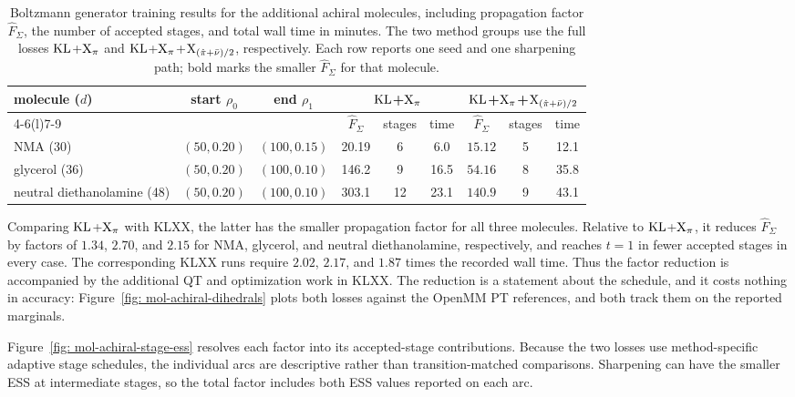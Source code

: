 \documentclass{article}
\begin{document}
\begin{table}[htb]
\centering
\small
\setlength{\tabcolsep}{3.5pt}
\begin{tabular}{lcccccccc}
\toprule
\multirow{2}{*}{molecule (\(d\))} &
\multirow{2}{*}{start \(\rho_0\)} &
\multirow{2}{*}{end \(\rho_1\)} &
\multicolumn{3}{c}{$\mathrm{KL}$+$\mathrm{X}_\pi$} &
\multicolumn{3}{c}{$\mathrm{KL}$+$\mathrm{X}_\pi$+$\mathrm{X}_{(\hat\pi+\bar\nu)/2}$} \\
\cmidrule(lr){4-6}\cmidrule(l){7-9}
& & & \(\hat F_\Sigma\) & stages & time
  & \(\hat F_\Sigma\) & stages & time \\
\midrule
NMA (30) & \((50,0.20)\) & \((100,0.15)\)
& 20.19 & 6 & 6.0 & \(\mathbf{15.12}\) & 5 & 12.1 \\
\addlinespace
glycerol (36) & \((50,0.20)\) & \((100,0.10)\)
& 146.2 & 9 & 16.5 & \(\mathbf{54.16}\) & 8 & 35.8 \\
\addlinespace
neutral diethanolamine (48) & \((50,0.20)\) & \((100,0.10)\)
& 303.1 & 12 & 23.1 & \(\mathbf{140.9}\) & 9 & 43.1 \\
\bottomrule
\end{tabular}
\caption{Boltzmann generator training results for the additional achiral molecules, including propagation factor \(\hat F_\Sigma\), the number of accepted stages, and total wall time in minutes. The two method groups use the full losses $\mathrm{KL}$+$\mathrm{X}_\pi$ and $\mathrm{KL}$+$\mathrm{X}_\pi$+$\mathrm{X}_{(\hat\pi+\bar\nu)/2}$, respectively. Each row reports one seed and one sharpening path; bold marks the smaller \(\hat F_\Sigma\) for that molecule.}
\label{tab: mol-achiral-summary}
\end{table}


Comparing $\mathrm{KL}$+$\mathrm{X}_\pi$ with KLXX, the latter has the smaller propagation factor for all three molecules. Relative to $\mathrm{KL}$+$\mathrm{X}_\pi$, it reduces \(\hat F_\Sigma\) by factors of \(1.34\), \(2.70\), and \(2.15\) for NMA, glycerol, and neutral diethanolamine, respectively, and reaches \(t=1\) in fewer accepted stages in every case. The corresponding KLXX runs require \(2.02\), {\color{purple}\(2.17\)}, and {\color{purple}\(1.87\)} times the recorded wall time. Thus the factor reduction is accompanied by the additional QT and optimization work in KLXX. {\color{blue}The reduction is a statement about the schedule, and it costs nothing in accuracy: Figure~\ref{fig: mol-achiral-dihedrals} plots both losses against the OpenMM PT references, and both track them on the reported marginals.}

Figure~\ref{fig: mol-achiral-stage-ess} resolves each factor into its accepted-stage contributions. Because the two losses use method-specific adaptive stage schedules, the individual arcs are descriptive rather than transition-matched comparisons. Sharpening can have the smaller ESS at intermediate stages, so the total factor includes both ESS values reported on each arc.
\end{document}
